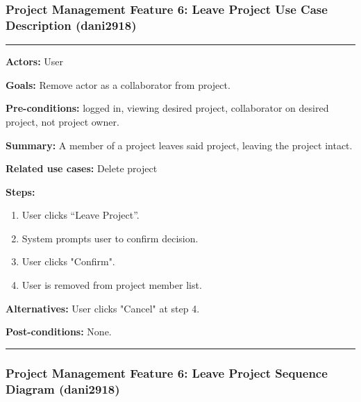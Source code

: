 \documentclass[twoside,letterpaper]{article}
\begin{document}
\subsubsection[Project Management Feature 6: Leave Project Use Case Description (dani2918)]{\rmfamily\bfseries\color{black}
	Project Management Feature 6: Leave Project Use Case Description  (dani2918)}
\hypertarget{RefHeading22059017292}{}
\label{pm:uc7}
\bigskip

\vspace{2pt}
\hrule
\vspace{8pt}
\noindent \textbf{Actors:} User \newline

\noindent \textbf{Goals:} Remove actor as a collaborator from project. \newline

\noindent  \textbf{Pre-conditions:} logged in, viewing desired project, collaborator on desired project, not project owner.  \newline

\noindent \textbf{Summary:} A member of a project leaves said project, leaving the project intact. \newline

\noindent \textbf{Related use cases:} Delete project \newline

\noindent \textbf{Steps:} \begin{enumerate}
  \item User clicks ``Leave Project''.
  \item System prompts user to confirm decision.
  \item User clicks "Confirm".
  \item User is removed from project member list.
 \end{enumerate}
 
\noindent  \textbf{Alternatives:} User clicks "Cancel" at step 4. \newline
 
\noindent  \textbf{Post-conditions:} None. \newline
\vspace{8pt}
\hrule

\newpage

\subsubsection[Project Management Feature 6: Leave Project Sequence Diagram (dani2918)]{\rmfamily\bfseries\color{black}
	Project Management Feature 6: Leave Project Sequence Diagram  (dani2918)}
	\label{pm:sd7}
\end{document}

